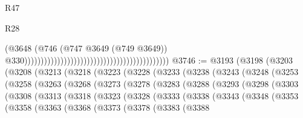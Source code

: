 \begin{lexlean}{R47}
\begin{lexlean}{R28}
\begin{coremodule}
{{{{{{{{{{{{{{{{{{{{{{{{{{{{{{{{{{{{{{{{{{{{{{{{{{{{{{{{{{{{{{{{{{{{{{{{{{{{{{{{{{{{{{{{{{{{{{{{{{{{{{{{{{{{{{{{{{{{{{{{{{{{{{{{{{{{{                                                                                        (@3648
                                                                                          (@746
                                                                                            (@747
                                                                                              @3649
                                                                                              (@749
                                                                                                @3649))
                                                                                            @330))))))))))))))))))))))))))))))))))))))))))))
@3746 := @3193
    (@3198
      (@3203
        (@3208
          (@3213
            (@3218
              (@3223
                (@3228
                  (@3233
                    (@3238
                      (@3243
                        (@3248
                          (@3253
                            (@3258
                              (@3263
                                (@3268
                                  (@3273
                                    (@3278
                                      (@3283
                                        (@3288
                                          (@3293
                                            (@3298
                                              (@3303
                                                (@3308
                                                  (@3313
                                                    (@3318
                                                      (@3323
                                                        (@3328
                                                          (@3333
                                                            (@3338
                                                              (@3343
                                                                (@3348
                                                                  (@3353
                                                                    (@3358
                                                                      (@3363
                                                                        (@3368
                                                                          (@3373
                                                                            (@3378
                                                                              (@3383
                                                                                (@3388
}}}}}}}}}}}}}}}}}}}}}}}}}}}}}}}}}}}}}}}}}}}}}}}}}}}}}}}}}}}}}}}}}}}}}}}}}}}}}}}}}}}}}}}}}}}}}}}}}}}}}}}}}}}}}}}}}}}}}}}}}}}}}}}}}}}}}
\end{coremodule}
\end{lexlean}
\end{lexlean}
